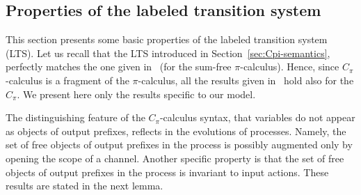 \subsection{Properties of the labeled transition system}\label{sec:Cpi_properties_of_lts}
This section presents some basic properties of the labeled transition system (LTS). 
Let us recall that the LTS introduced in Section~\ref{sec:Cpi-semantics}, perfectly matches the one given in~\cite{pi_calculus} (for the sum-free $\pi$-calculus). Hence, since $C_\pi$-calculus is a fragment of the $\pi$-calculus, all the results given in~\cite{pi_calculus} hold also for the $C_\pi$. %
We present here only the results specific to our model.

The distinguishing feature of the $C_\pi$-calculus syntax, that variables do not appear as objects of output prefixes, reflects in the evolutions of processes. Namely, the set of free objects of output prefixes in the process is possibly augmented only by opening the scope of a channel. 
Another specific property is that the set of free objects of output prefixes in the process is invariant to input actions. These results are stated in the next lemma. 


